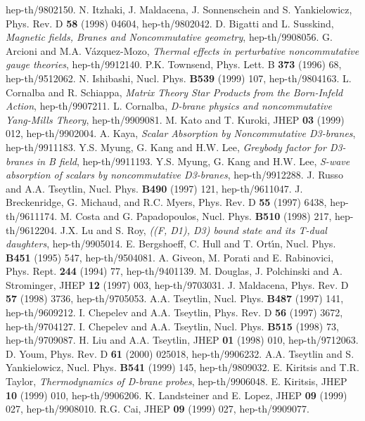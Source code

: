 \documentclass[a4paper,12pt]{article}
\begin{document}
\begin{thebibliography}{99}
  hep-th/9802150.
N. Itzhaki, J. Maldacena, J. Sonnenschein and
  S. Yankielowicz, Phys. Rev. D {\bf 58} (1998) 04604, hep-th/9802042.
D. Bigatti and L. Susskind, {\it Magnetic fields, Branes and
  Noncommutative geometry}, hep-th/9908056.
G. Arcioni and M.A. V\'azquez-Mozo, {\it Thermal effects
  in perturbative noncommutative gauge theories}, hep-th/9912140.
 P.K. Townsend, Phys. Lett. B {\bf 373} (1996) 68, hep-th/9512062.
N. Ishibashi, Nucl. Phys. {\bf B539} (1999) 107,
 hep-th/9804163.
L. Cornalba and R. Schiappa, {\it Matrix Theory Star Products
           from the Born-Infeld Action}, hep-th/9907211.
L. Cornalba, {\it D-brane physics and noncommutative Yang-Mills
  Theory}, hep-th/9909081.
 M. Kato and T. Kuroki, JHEP {\bf 03} (1999) 012,
         hep-th/9902004.
A. Kaya, {\it Scalar Absorption by Noncommutative D3-branes},
  hep-th/9911183.
Y.S. Myung, G. Kang and H.W. Lee, {\it Greybody factor
  for D3-branes in B field}, hep-th/9911193.
Y.S. Myung, G. Kang and H.W. Lee, {\it S-wave absorption
  of scalars by noncommutative D3-branes}, hep-th/9912288.
J. Russo and A.A. Tseytlin, Nucl. Phys. {\bf B490} (1997) 121,
  hep-th/9611047.
J. Breckenridge, G. Michaud, and R.C. Myers, Phys. Rev.
  D {\bf 55} (1997) 6438, hep-th/9611174.
M. Costa and G. Papadopoulos, Nucl. Phys. {\bf B510} (1998) 217,
        hep-th/9612204.
J.X. Lu and S. Roy, {\it ((F, D1), D3) bound state and its T-dual
  daughters}, hep-th/9905014.
E. Bergshoeff, C. Hull and T. Ort\'{\i}n, Nucl. Phys. {\bf B451}
  (1995) 547, hep-th/9504081.
 A. Giveon, M. Porati and E. Rabinovici, Phys. Rept. {\bf 244}
  (1994) 77, hep-th/9401139.
M. Douglas, J. Polchinski and A. Strominger, JHEP {\bf 12}
  (1997) 003, hep-th/9703031.
J. Maldacena, Phys. Rev. D {\bf 57} (1998) 3736,
  hep-th/9705053.
A.A. Tseytlin, Nucl. Phys. {\bf B487} (1997) 141,
  hep-th/9609212.
I. Chepelev and A.A. Tseytlin, Phys. Rev. D {\bf 56}
  (1997) 3672, hep-th/9704127.
I. Chepelev and A.A. Tseytlin, Nucl. Phys. {\bf B515}
  (1998) 73, hep-th/9709087.
H. Liu and A.A. Tseytlin, JHEP {\bf 01} (1998) 010,
  hep-th/9712063.
D. Youm, Phys. Rev. D {\bf 61} (2000) 025018,
  hep-th/9906232.
A.A. Tseytlin and S. Yankielowicz, Nucl. Phys. {\bf B541}
  (1999) 145, hep-th/9809032.
E. Kiritsis and T.R. Taylor, {\it Thermodynamics of D-brane
  probes}, hep-th/9906048.
E. Kiritsis, JHEP {\bf 10} (1999) 010, hep-th/9906206.
K. Landsteiner and E. Lopez, JHEP {\bf 09} (1999) 027,
  hep-th/9908010.
R.G. Cai, JHEP {\bf 09} (1999) 027, hep-th/9909077.
\end{thebibliography}
\end{document}
